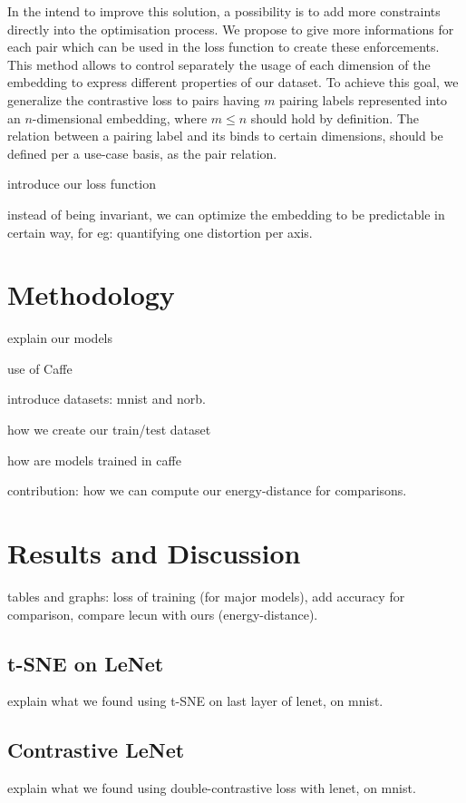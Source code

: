 \documentclass[a4paper,12pt]{report}
\begin{document}
In the intend to improve this solution, a possibility is to add more constraints directly into the optimisation process.
We propose to give more informations for each pair which can be used in the loss function to create these enforcements.
This method allows to control separately the usage of each dimension of the embedding to express different properties of our dataset.
To achieve this goal, we generalize the contrastive loss to pairs having $m$ pairing labels represented into an $n$-dimensional embedding, where $m \leq n$ should hold by definition.
The relation between a pairing label and its binds to certain dimensions, should be defined per a use-case basis, as the pair relation.

introduce our loss function

instead of being invariant, we can optimize the embedding to be predictable in certain way, for eg: quantifying one distortion per axis.


\chapter{Methodology}

explain our models

use of Caffe

introduce datasets: mnist and norb.

how we create our train/test dataset

how are models trained in caffe

contribution: how we can compute our energy-distance for comparisons.


\chapter{Results and Discussion}

tables and graphs: loss of training (for major models), add accuracy for comparison, compare lecun with ours (energy-distance).

\section{t-SNE on LeNet}
explain what we found using t-SNE on last layer of lenet, on mnist.

\section{Contrastive LeNet}
explain what we found using double-contrastive loss with lenet, on mnist.
\end{document}

